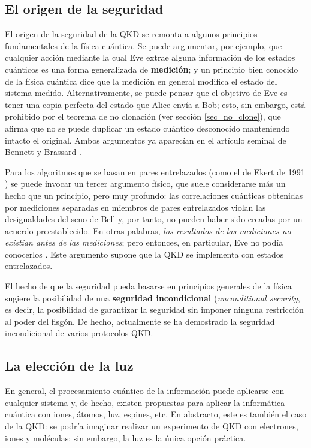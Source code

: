 \documentclass[a4paper,11pt]{book} %
\numberwithin{equation}{chapter}
\begin{document}
		\subsection{El origen de la seguridad}

El origen de la seguridad de la QKD se remonta a algunos principios fundamentales de la física cuántica. Se puede argumentar, por ejemplo, que cualquier acción mediante la cual Eve extrae alguna información de los estados cuánticos es una forma generalizada de \textbf{medición}; y un principio bien conocido de la física cuántica dice que la medición en general modifica el estado del sistema medido. Alternativamente, se puede pensar que el objetivo de Eve es tener una copia perfecta del estado que Alice envía a Bob; esto, sin embargo, está prohibido por el teorema de no clonación (ver sección \ref{sec_no_clone}), que afirma que no se puede duplicar un estado cuántico desconocido manteniendo intacto el original. Ambos argumentos ya aparecían en el artículo seminal de Bennett y Brassard \cite{BB84}. 

Para los algoritmos que se basan en pares entrelazados (como el de Ekert de 1991 \cite{Ekert-1991})  se puede invocar un tercer argumento físico, que suele considerarse más un hecho que un principio, pero muy profundo: las correlaciones cuánticas obtenidas por mediciones separadas en miembros de pares entrelazados violan las desigualdades del seno de Bell y, por tanto, no pueden haber sido creadas por un acuerdo preestablecido. En otras palabras, \textit{los resultados de las mediciones no existían antes de las mediciones}; pero entonces, en particular, Eve no podía conocerlos \cite{Ekert-1991}. Este argumento supone que la QKD se implementa con estados entrelazados.		

El hecho de que la seguridad pueda basarse en principios generales de la física sugiere la posibilidad de una \textbf{seguridad incondicional} (\textit{unconditional security}, es decir, la posibilidad de garantizar la seguridad sin imponer ninguna restricción al poder del fisgón. De hecho, actualmente se ha demostrado la seguridad incondicional de varios protocolos QKD.
		
		\subsection{La elección de la luz}

En general, el procesamiento cuántico de la información puede aplicarse con cualquier sistema y, de hecho, existen propuestas para aplicar la informática cuántica con iones, átomos, luz, espines, etc. En abstracto, este es también el caso de la QKD: se podría imaginar realizar un experimento de QKD con electrones, iones y moléculas; sin embargo, la luz es la única opción práctica.
\end{document}
